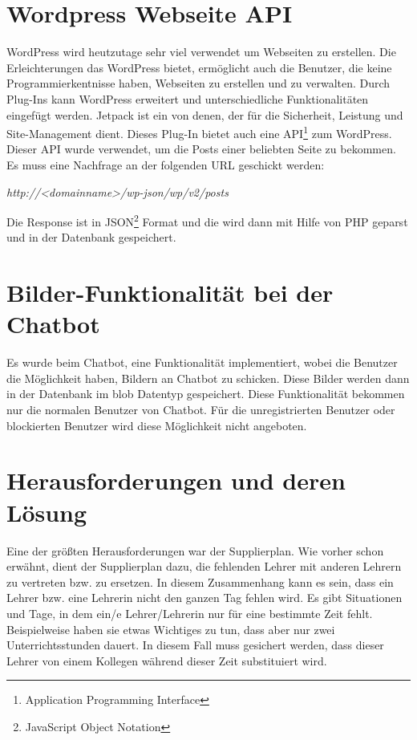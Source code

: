 \section{Wordpress Webseite API}


WordPress wird heutzutage sehr viel verwendet um Webseiten zu erstellen. Die Erleichterungen das WordPress bietet, ermöglicht auch die Benutzer, die keine Programmierkentnisse haben, Webseiten zu erstellen und zu verwalten. Durch Plug-Ins kann WordPress erweitert und unterschiedliche Funktionalitäten eingefügt werden. Jetpack ist ein von denen, der für die Sicherheit, Leistung und Site-Management dient. Dieses Plug-In bietet auch eine API\footnote{Application Programming Interface} zum WordPress. Dieser API wurde verwendet, um die Posts einer beliebten Seite zu bekommen. Es muss eine Nachfrage an der folgenden URL geschickt werden:


\begin{center}
	\textit{http://\textless{}\textit{domainname}\textgreater{}/wp-json/wp/v2/posts}
	
\end{center}


Die Response ist in JSON\footnote{JavaScript Object Notation} Format und die wird dann mit Hilfe von PHP geparst und in der Datenbank gespeichert. 

\section{Bilder-Funktionalität bei der Chatbot}
Es wurde beim Chatbot, eine Funktionalität implementiert, wobei die Benutzer die Möglichkeit haben, Bildern an Chatbot zu schicken. Diese Bilder werden dann in der Datenbank im blob Datentyp gespeichert. Diese Funktionalität bekommen nur die normalen Benutzer von Chatbot. Für die unregistrierten Benutzer oder blockierten Benutzer wird diese Möglichkeit nicht angeboten.

\section{Herausforderungen und deren Lösung}

Eine der größten Herausforderungen war der Supplierplan. Wie vorher schon erwähnt, dient der Supplierplan  dazu, die fehlenden Lehrer mit anderen Lehrern zu vertreten bzw. zu ersetzen. In diesem Zusammenhang kann es sein, dass ein Lehrer bzw. eine Lehrerin nicht den ganzen Tag fehlen wird. Es gibt Situationen und Tage, in dem ein/e Lehrer/Lehrerin nur für eine bestimmte Zeit fehlt. Beispielweise haben sie etwas Wichtiges zu tun, dass aber nur zwei Unterrichtsstunden dauert. In diesem Fall muss gesichert werden, dass dieser Lehrer von einem Kollegen während dieser Zeit substituiert wird.


